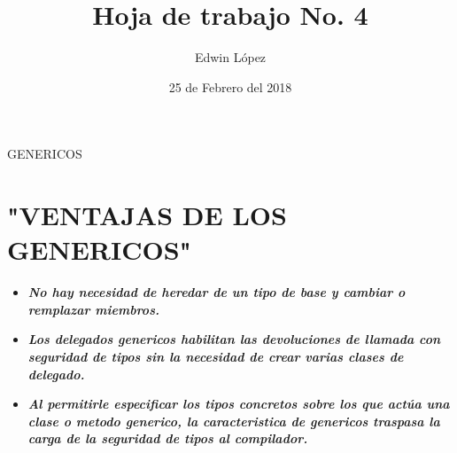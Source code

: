 \documentclass{article}
\author{Edwin L\'opez}
\title {\textbf{Hoja de trabajo No. 4}}
\date {25 de Febrero del 2018}
\begin{document}
\maketitle
GENERICOS

\section{"VENTAJAS DE LOS GENERICOS"}

\begin{itemize}

\item \textbf{ \textit{No hay necesidad de heredar de un tipo de base y cambiar o remplazar miembros. }}
\item \textbf{ \textit{Los delegados genericos habilitan las devoluciones de llamada con seguridad de tipos sin la necesidad de crear varias clases de delegado.
}}
\item \textbf{ \textit{Al permitirle especificar los tipos concretos sobre los que actúa una clase o metodo generico, la caracteristica de genericos traspasa la carga de la seguridad de tipos al compilador.}}


\end{itemize}
\end{document}
